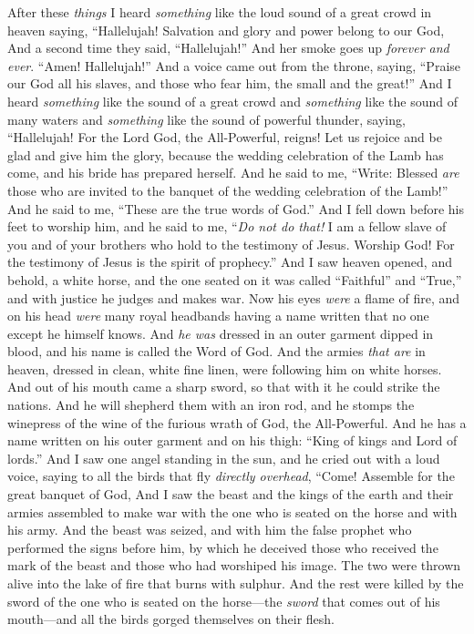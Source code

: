 \begin{biblechapter} %
 After these \textit{things} I heard \textit{something} like the loud sound of a great crowd in heaven saying,
\verse “Hallelujah! 
Salvation and glory and power belong to our God,
\verse And a second time they said, “Hallelujah!”
\verse And her smoke goes up \textit{forever and ever}. “Amen! Hallelujah!”
\verse And a voice came out from the throne, saying, “Praise our God 
all his slaves, 
and those who fear him, 
the small and the great!”
 And I heard \textit{something} like the sound of a great crowd and \textit{something} like the sound of many waters and \textit{something} like the sound of powerful thunder, saying,
\verse “Hallelujah! 
For the Lord God, the All-Powerful, reigns!
\verse Let us rejoice and be glad 
and give him the glory, 
because the wedding celebration of the Lamb has come, 
and his bride has prepared herself.
\verse And he said to me, “Write: Blessed \textit{are} those who are invited to the banquet of the wedding celebration of the Lamb!” And he said to me, “These are the true words of God.”
\verse And I fell down before his feet to worship him, and he said to me, “\textit{Do not do that!} I am a fellow slave of you and of your brothers who hold to the testimony of Jesus. Worship God! For the testimony of Jesus is the spirit of prophecy.”
 And I saw heaven opened, and behold, a white horse, and the one seated on it was called “Faithful” and “True,” and with justice he judges and makes war.
\verse Now his eyes \textit{were} a flame of fire, and on his head \textit{were} many royal headbands having a name written that no one except he himself knows.
\verse And \textit{he was} dressed in an outer garment dipped in blood, and his name is called the Word of God.
\verse And the armies \textit{that are} in heaven, dressed in clean, white fine linen, were following him on white horses.
\verse And out of his mouth came a sharp sword, so that with it he could strike the nations. And he will shepherd them with an iron rod, and he stomps the winepress of the wine of the furious wrath of God, the All-Powerful.
\verse And he has a name written on his outer garment and on his thigh: “King of kings and Lord of lords.”
\verse And I saw one angel standing in the sun, and he cried out with a loud voice, saying to all the birds that fly \textit{directly overhead},
\verse “Come! Assemble for the great banquet of God,
\verse And I saw the beast and the kings of the earth and their armies assembled to make war with the one who is seated on the horse and with his army.
\verse And the beast was seized, and with him the false prophet who performed the signs before him, by which he deceived those who received the mark of the beast and those who had worshiped his image. The two were thrown alive into the lake of fire that burns with sulphur.
\verse And the rest were killed by the sword of the one who is seated on the horse—the \textit{sword} that comes out of his mouth—and all the birds gorged themselves on their flesh.
\end{biblechapter}

